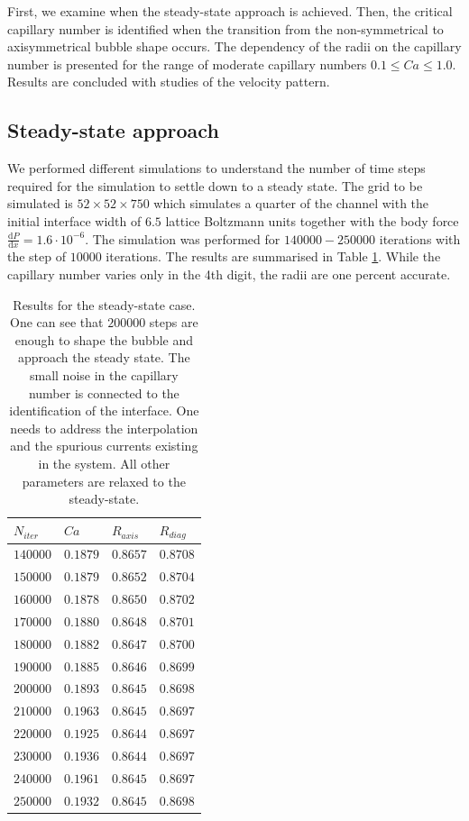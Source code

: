\documentclass{article}
\begin{document}
First, we examine when the steady-state approach is
achieved. Then, the critical capillary number is identified when the transition from the
non-symmetrical to axisymmetrical bubble shape occurs. The dependency of the radii on the capillary
number is presented for the range of moderate capillary numbers $0.1 \leq Ca \leq 1.0$. Results are
concluded with studies of the velocity pattern.

\subsection{Steady-state approach}
\label{sec:steady:state}
We performed different simulations to understand the number of time steps required for the
simulation to
settle down to a steady state. The grid to be simulated is $52 \times 52 \times 750$ which simulates
a quarter of the channel with the initial interface
width of $6.5$ lattice Boltzmann units together with the body force $\frac{\mathrm{d}P}{\mathrm{d}x}=1.6
\cdot 10^{-6}$. The simulation was performed for $140000-250000$ iterations with the step of
$10000$ iterations. The results are summarised in Table \ref{table:steady:state}. While the
capillary number varies only in the 4th digit, the radii are one percent accurate. 
\begin{table}
\begin{tabularx}{\textwidth}{|X|X|X|X|}
\hline
$N_{iter}$&$Ca$&$R_{axis}$&$R_{diag}$\\
\hline
$140000$&$0.1879$&$0.8657$&$0.8708$\\
$150000$&$0.1879$&$0.8652$&$0.8704$\\
$160000$&$0.1878$&$0.8650$&$0.8702$\\
$170000$&$0.1880$&$0.8648$&$0.8701$\\
$180000$&$0.1882$&$0.8647$&$0.8700$\\
$190000$&$0.1885$&$0.8646$&$0.8699$\\
$200000$&$0.1893$&$0.8645$&$0.8698$\\
$210000$&$0.1963$&$0.8645$&$0.8697$\\
$220000$&$0.1925$&$0.8644$&$0.8697$\\
$230000$&$0.1936$&$0.8644$&$0.8697$\\
$240000$&$0.1961$&$0.8645$&$0.8697$\\
$250000$&$0.1932$&$0.8645$&$0.8698$\\
\hline
\end{tabularx}
\caption{Results for the steady-state case. One
can see that $200000$ steps are enough to shape
the bubble and approach the steady state. The small noise in the capillary number is connected to
the identification of the interface. One needs to address the interpolation and the spurious
currents existing in the system. All other parameters are relaxed to the
steady-state.\label{table:steady:state}}
\end{table}
\end{document}
